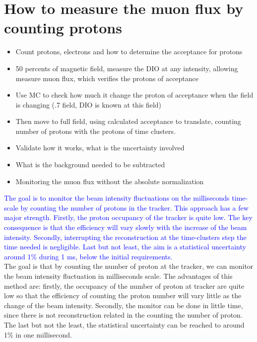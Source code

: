 \documentclass[12pt]{extarticle}
\begin{document}
\section{How to measure the muon flux by counting protons}
\begin{itemize}
    \item 
    Count protons, electrons and how to determine the acceptance for protons
    \item 
    50 percents of magnetic field, measure the DIO at any intensity, allowing measure muon flux, which verifies the protons of acceptance 
    \item
    Use MC to check how much it change the proton of acceptance when the field is changing (.7 field, DIO is known at this field)
    \item
    Then move to full field, using calculated acceptance to translate, counting number of protons with the protons of time clusters.
    \item
    Validate how it works, what is the uncertainty involved
    \item
    What is the background needed to be subtracted
    \item
    Monitoring the muon flux without the absolute normalization
    
    
\end{itemize}

\textcolor{blue}{The goal is to monitor the beam intensity fluctuations on the milliseconds time-scale by counting the number of protons in the tracker. This approach has a few major strength. Firstly, the proton occupancy of the tracker is quite low. The key consequence is that the efficiency will vary slowly with the increase of the beam intensity. Secondly, interrupting the reconstruction at the time-clusters step the time needed is negligible. Last but not least, the aim is a statistical uncertainty around 1\% during 1 ms, below the initial requirements.}\\
\noindent The goal is that by counting the number of proton at the tracker, we can monitor the beam intensity fluctuation in milliseconds scale. The advantages of this method are: firstly, the occupancy of the number of proton at tracker are quite low so that the efficiency of counting the proton number will vary little as the change of the beam intensity. Secondly, the monitor can be done in little time, since there is not reconstruction related in the counting the number of proton. The last but not the least, the statistical uncertainty can be reached to around 1\% in one millisecond.
\end{document}
